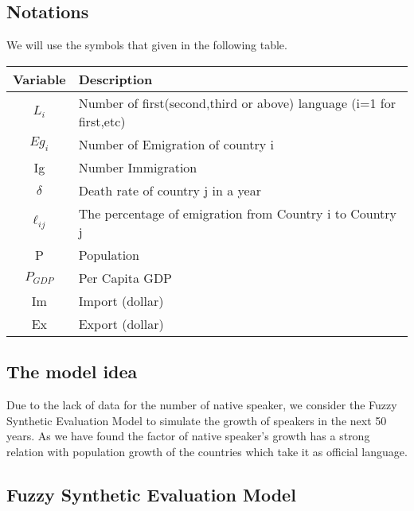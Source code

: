 \documentclass{mcmthesis}
\begin{document}
\subsection{Notations}
We will use the symbols that given in the following table.
\begin{table}[h]
\begin{center}
\begin{tabular}{c l}
\hline
\multicolumn{1}{l}{Variable} & Description                                      \\
\hline
$L_i$                            & Number of first(second,third or above) language (i=1 for first,etc)                                       \\
$ Eg_i  $                         &Number of Emigration of country i                                      \\
Ig                           &Number Immigration \\
$\delta $                      & Death rate of country j in a year\\
$\ell_{ij}   $                       &The percentage of emigration from Country i to Country j                                         \\
P                            & Population                                \\
$P_{GDP}   $                         & Per Capita GDP                                   \\
Im                            & Import (dollar)                                       \\
Ex                            & Export (dollar)                                   \\
\hline
\end{tabular}
\end{center}
\end{table}

\subsection{The model idea}
\qquad Due to the lack of data for the number of native speaker, we consider the Fuzzy Synthetic Evaluation Model to simulate the growth of speakers in the next 50 years.
As we have found the factor of native speaker's growth has a strong relation with population growth of the countries which take it as official language.

\subsection{Fuzzy Synthetic Evaluation Model}
\end{document}
